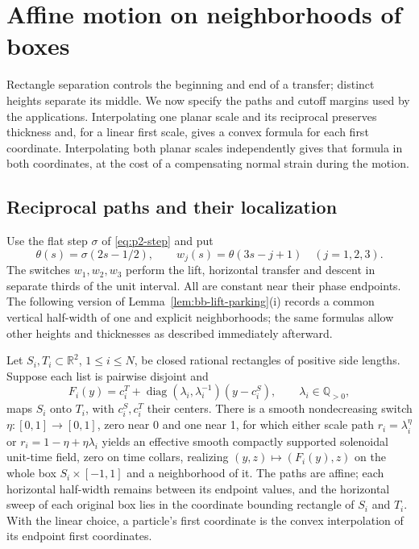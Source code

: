 \section{Affine motion on neighborhoods of boxes}\label{ba:geometry}

Rectangle separation controls the beginning and end of a transfer; distinct
heights separate its middle. We now specify the paths and cutoff margins
used by the applications. Interpolating one planar scale and its reciprocal
preserves thickness and, for a linear first scale, gives a convex formula
for each first coordinate. Interpolating both planar scales independently
gives that formula in both coordinates, at the cost of a compensating
normal strain during the motion.

\subsection{Reciprocal paths and their localization}
\label{sec:ba-localization}

Use the flat step $\sigma$ of \eqref{eq:p2-step} and put
\[
 \theta(s)=\sigma(2s-1/2),\qquad
 w_j(s)=\theta(3s-j+1)\quad(j=1,2,3).
\]
The switches $w_1,w_2,w_3$ perform the lift, horizontal transfer and
descent in separate thirds of the unit interval. All are constant near
their phase endpoints. The following version of
Lemma~\ref{lem:bb-lift-parking}(i) records a common vertical half-width
of one and explicit neighborhoods; the same formulas allow other heights
and thicknesses as described immediately afterward.

\begin{lemma}
\label{ba:two-interpolations}
Let $S_i,T_i\subset\mathbb R^2$, $1\le i\le N$, be closed rational
rectangles of positive side lengths.  Suppose each list is pairwise
disjoint and
\[
 F_i(y)=c_i^T+\operatorname{diag}(\lambda_i,\lambda_i^{-1})(y-c_i^S),
 \qquad\lambda_i\in\mathbb Q_{>0},
\]
maps $S_i$ onto $T_i$, with $c_i^S,c_i^T$ their centers.  There is a
smooth nondecreasing switch $\eta:[0,1]\to[0,1]$, zero near 0 and one
near 1, for which either scale
path $r_i=\lambda_i^\eta$ or $r_i=1-\eta+\eta\lambda_i$ yields an
effective smooth compactly supported solenoidal unit-time field, zero
on time collars, realizing $(y,z)\mapsto(F_i(y),z)$ on the whole box
$S_i\times[-1,1]$ and a neighborhood of it.  The paths are affine;
each horizontal half-width remains between its endpoint values, and the
horizontal sweep of each original box lies in the coordinate bounding
rectangle of $S_i$ and $T_i$. With the linear choice, a particle's first
coordinate is the convex
interpolation of its endpoint first coordinates.
\end{lemma}

